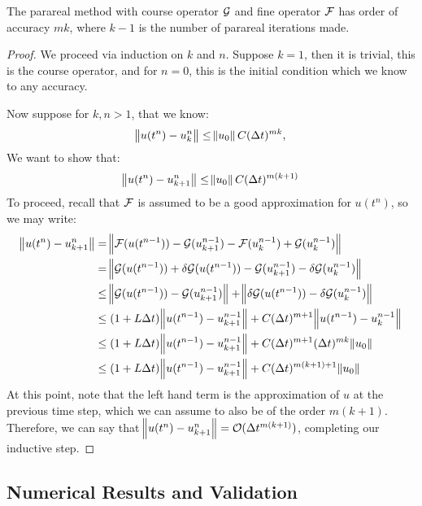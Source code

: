 \begin{theorem*}
  The parareal method with course operator $\mathcal{G}$ and fine operator $\mathcal{F}$
  has order of accuracy $mk$, where $k-1$ is the number of parareal iterations
  made. \cite{balarticle} \cite{fieldstalk}
\end{theorem*}
\begin{proof}
  We proceed via induction on $k$ and $n$. Suppose $k = 1$, then it is trivial,
  this is the course operator, and for $n = 0$, this is the initial condition
  which we know to any accuracy.

  Now suppose for $k,n > 1$, that we know:
  \[
    \norm{u(t^n) - u_k^n} \leq \norm{u_0}C(\Delta t)^{mk}, 
  \]
  We want to show that:
  \[
    \norm{u(t^n) - u_{k+1}^n} \leq \norm{u_0}C(\Delta t)^{m(k+1)}
  \]
  To proceed, recall that $\mathcal{F}$ is assumed to be a good approximation for
  $u(t^n)$, so we may write:
  \begin{align*}
    \norm{u(t^n) - u_{k+1}^n} & = \norm{\mathcal{F}(u(t^{n-1})) -
    \mathcal{G}(u^{n-1}_{k+1}) - \mathcal{F}(u^{n-1}_k) + \mathcal{G}(u^{n-1}_k)} \\
    & = \norm{\mathcal{G}(u(t^{n-1})) + \delta \mathcal{G} (u(t^{n-1}))  -
    \mathcal{G}(u^{n-1}_{k+1}) - \delta \mathcal{G}(u^{n-1}_k)} \\
    & \leq \norm{\mathcal{G}(u(t^{n-1})) - \mathcal{G}(u^{n-1}_{k+1})} + 
    \norm{ \delta \mathcal{G} (u(t^{n-1})) - \delta \mathcal{G}(u^{n-1}_k)} \\
    & \leq (1+L\Delta t)\norm{u(t^{n-1}) - u^{n-1}_{k+1}} + 
    C(\Delta t)^{m+1}\norm{ u(t^{n-1}) - u^{n-1}_k} \\
    & \leq (1+L\Delta t)\norm{u(t^{n-1}) - u^{n-1}_{k+1}} + 
    C(\Delta t)^{m+1}(\Delta t)^{mk}\norm{ u_0 } \\
    & \leq (1+L\Delta t)\norm{u(t^{n-1}) - u^{n-1}_{k+1}} + 
    C(\Delta t)^{m(k+1)+1}\norm{ u_0 } \\
  \end{align*}
  At this point, note that the left hand term is the approximation of $u$ at the
  previous time step, which we can assume to also be of the order $m(k+1)$.
  Therefore, we can say that $\norm{u(t^n) - u_{k+1}^n} = \mathcal{O}(\Delta
  t^{m(k+1)})$, completing our inductive step.
\end{proof}

\subsection{Numerical Results and Validation}


